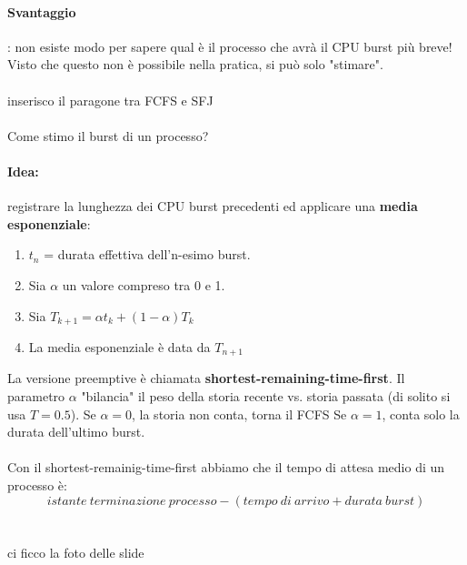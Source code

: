 \documentclass[11pt]{article}
\begin{document}
\paragraph{Svantaggio}: non esiste modo per sapere qual è il processo che avrà il CPU burst più breve! Visto che questo non è possibile nella pratica, si può solo "stimare".
\\ \\ 
inserisco il paragone tra FCFS  e SFJ
\\ \\
Come stimo il burst di un processo?
\paragraph{Idea:} registrare la lunghezza dei CPU burst precedenti ed applicare una \textbf{media esponenziale}:
\begin{enumerate}
	\item $t_n$ = durata effettiva dell'n-esimo burst.
	\item Sia $\alpha$ un valore compreso tra 0 e 1.
	\item Sia $T_{k+1} = \alpha t_k + (1 - \alpha ) T_k$
	\item La media esponenziale è data da $T_{n+1 }$
\end{enumerate}
La versione preemptive è chiamata \textbf{shortest-remaining-time-first}.
Il parametro $\alpha$ "bilancia" il peso della storia recente vs. storia passata (di solito si usa $T = 0.5$).
Se $\alpha = 0$, la storia non conta, torna il FCFS
Se $\alpha = 1$, conta solo la durata dell'ultimo burst.
\\ \\
Con il shortest-remainig-time-first abbiamo che il tempo di attesa medio di un processo è:
\begin{equation}
istante \medspace terminazione  \medspace processo - (tempo \medspace di \medspace arrivo  + durata \medspace burst)
\end{equation}
\\ \\
ci ficco la foto delle slide
\\ \\
\end{document}

